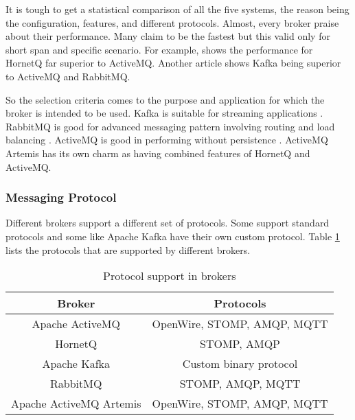 It is tough to get a statistical comparison of all the five systems, the reason being the configuration, features, and different protocols. Almost, every broker praise about their performance. Many claim to be the fastest but this valid only for short span and specific scenario. For example, \parencite{rabbitmq_perf} shows the performance for HornetQ far superior to ActiveMQ. Another article \parencite{broker_kafka_rabbit_activemq} shows Kafka being superior to ActiveMQ and RabbitMQ.

So the selection criteria comes to the purpose and application for which the broker is intended to be used. Kafka is suitable for streaming applications \parencite{kafka_official_site}. RabbitMQ is good for advanced messaging pattern involving routing and load balancing \parencite{rostanski2014evaluation}. ActiveMQ is good in performing without persistence \parencite{broker_queue_comp}. ActiveMQ Artemis has its own charm as having combined features of HornetQ and ActiveMQ.

\subsubsection{Messaging Protocol}

Different brokers support a different set of protocols. Some support standard protocols and some like Apache Kafka have their own custom protocol. Table \ref{table:comparison_protocol} lists the protocols that are supported by different brokers.
\begin{table}[h!]
  \centering
  \caption{Protocol support in brokers}
  \label{table:comparison_protocol}
  \begin{tabular}{cc}
    \toprule
    Broker & Protocols \\
    \midrule
    Apache ActiveMQ & OpenWire, STOMP, AMQP, MQTT \\
    HornetQ & STOMP, AMQP \\
    Apache Kafka & Custom binary protocol \\
    RabbitMQ & STOMP, AMQP, MQTT \\
    Apache ActiveMQ Artemis & OpenWire, STOMP, AMQP, MQTT \\
    \bottomrule
  \end{tabular}
\end{table} 
